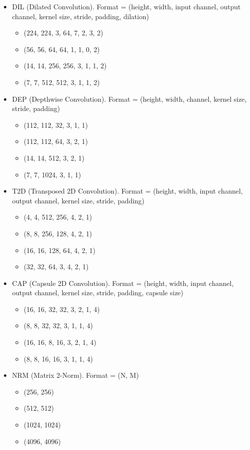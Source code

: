 \begin{itemize}
	\item DIL (Dilated Convolution). Format = (height, width, input channel, output channel, kernel size, stride, padding, dilation)
	\begin{itemize}[topsep=-0.1em, itemsep=-0.2em]
		\item (224, 224, 3, 64, 7, 2, 3, 2)
		\item (56, 56, 64, 64, 1, 1, 0, 2)
		\item  (14, 14, 256, 256, 3, 1, 1, 2)
		\item (7, 7, 512, 512, 3, 1, 1, 2)
	\end{itemize}
	
	\item DEP (Depthwise Convolution). Format = (height, width, channel, kernel size, stride, padding)
	\begin{itemize}[topsep=-0.1em, itemsep=-0.2em]
		\item (112, 112, 32,  3, 1, 1)
		\item (112, 112, 64,  3, 2, 1)
		\item (14,  14, 512, 3, 2, 1)
		\item (7,   7, 1024, 3, 1, 1)
	\end{itemize}
	
	\item T2D (Transposed 2D Convolution). Format = (height, width, input channel, output channel, kernel size, stride, padding)
	\begin{itemize}[topsep=-0.1em, itemsep=-0.2em]
		\item (4, 4, 512, 256, 4, 2, 1)
		\item (8, 8, 256, 128, 4, 2, 1)
		\item (16, 16, 128, 64, 4, 2, 1)
		\item (32, 32, 64, 3, 4, 2, 1)
	\end{itemize}
	
	\item CAP (Capsule 2D Convolution). Format = (height, width, input channel, output channel, kernel size, stride, padding, capsule size)
	\begin{itemize}[topsep=-0.1em, itemsep=-0.2em]
		\item (16, 16, 32, 32, 3, 2, 1, 4)
		\item (8,  8, 32, 32, 3, 1, 1, 4)
		\item (16, 16,  8, 16, 3, 2, 1, 4)
		\item (8,  8, 16, 16, 3, 1, 1, 4)
	\end{itemize}
	
	\item NRM (Matrix 2-Norm). Format = (N, M)
	\begin{itemize}[topsep=-0.1em, itemsep=-0.2em]
		\item (256, 256)
		\item (512, 512)
		\item (1024, 1024)
		\item (4096, 4096)
	\end{itemize}
	

\end{itemize}
